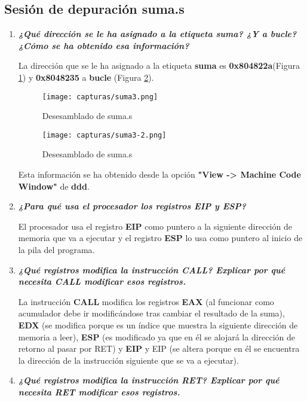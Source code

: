 \subsection{Sesión de depuración suma.s}
\begin{enumerate}
	\item \textbf{\textit{¿Qué dirección se le ha asignado a la etiqueta suma? ¿Y a bucle? ¿Cómo se ha obtenido esa información?}}
	
	La dirección que se le ha asignado a la etiqueta \textbf{suma} es \textbf{0x804822a}(Figura \ref{fig:suma3}) y \textbf{0x8048235} a \textbf{bucle} (Figura \ref{fig:suma3-2}).
	
	\begin{figure}[H] %
		\centering
		\texttt{[image: capturas/suma3.png]}  
		\caption{Desesamblado de suma.s} 
		\label{fig:suma3}
	\end{figure}
	\begin{figure}[H] %
		\centering
		\texttt{[image: capturas/suma3-2.png]}  
		\caption{Desesamblado de suma.s} 
		\label{fig:suma3-2}
	\end{figure}

	Esta información se ha obtenido desde la opción \textbf{"View -> Machine Code Window"} de \textbf{ddd}.
	
	\item \textbf{\textit{¿Para qué usa el procesador los registros EIP y ESP?}}
	
	El procesador usa el registro \textbf{EIP} como puntero a la siguiente dirección de memoria que va a ejecutar y el registro \textbf{ESP} lo usa como puntero al inicio de la pila del programa.
	
	\item \textbf{\textit{¿Qué registros modifica la instrucción CALL? Explicar por qué necesita CALL modificar esos registros.}}
	
	La instrucción \textbf{CALL} modifica los registros \textbf{EAX} (al funcionar como acumulador debe ir modificándose tras cambiar el resultado de la suma), \textbf{EDX} (se modifica porque es un índice que muestra la siguiente dirección de memoria a leer), \textbf{ESP} (es modificado ya que en él se alojará la dirección de retorno al pasar por RET) y \textbf{EIP} y EIP (se altera porque en él se encuentra la dirección de la instrucción siguiente que se va a ejecutar).
	
	\item \textbf{\textit{¿Qué registros modifica la instrucción RET? Explicar por qué necesita RET modificar esos registros.}}
	

\end{enumerate}
